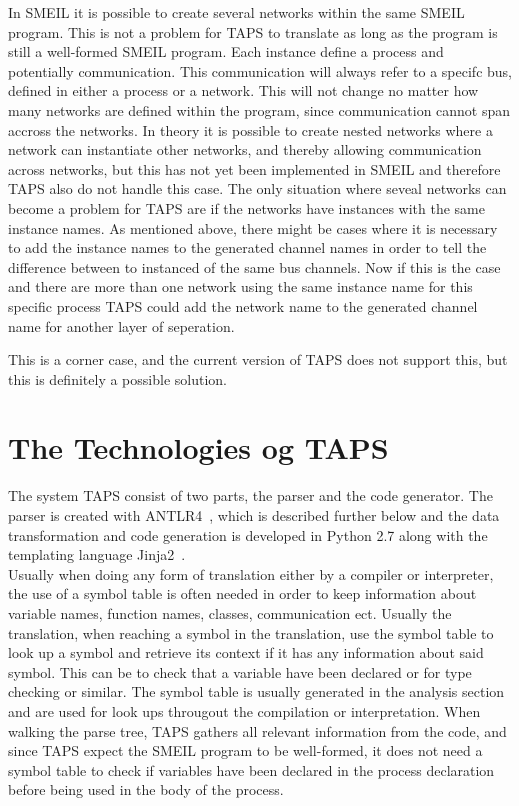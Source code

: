In SMEIL it is possible to create several networks within the same SMEIL program. This is not a problem for TAPS to translate as long as the program is still a well-formed SMEIL program. Each instance define a process and potentially communication. This communication will always refer to a specifc bus, defined in either a process or a network. This will not change no matter how many networks are defined within the program, since communication cannot span accross the networks.
In theory it is possible to create nested networks where a network can instantiate other networks, and thereby allowing communication across networks, but this has not yet been implemented in SMEIL and therefore TAPS also do not handle this case.
The only situation where seveal networks can become a problem for TAPS are if the networks have instances with the same instance names. As mentioned above, there might be cases where it is necessary to add the instance names to the generated \cspm{} channel names in order to tell the difference between to instanced of the same bus channels. Now if this is the case and there are more than one network using the same instance name for this specific process TAPS could add the network name to the generated \cspm{} channel name for another layer of seperation.

This is a corner case, and the current version of TAPS does not support this, but this is definitely a possible solution.


\section{The Technologies og TAPS}
The system TAPS consist of two parts, the parser and the code generator. The parser is created with ANTLR4~\cite{antlr}, which is described further below and the data transformation and code generation is developed in Python 2.7 along with the templating language Jinja2~\cite{jinja2}.\\

Usually when doing any form of translation either by a compiler or interpreter, the use of a symbol table is often needed in order to keep information about variable names, function names, classes, communication ect. Usually the translation, when reaching a symbol in the translation, use the symbol table to look up a symbol and retrieve its context if it has any information about said symbol. This can be to check that a variable have been declared or for type checking or similar. The symbol table is usually generated in the analysis section and are used for look ups througout the compilation or interpretation. When walking the parse tree, TAPS gathers all relevant information from the code, and since TAPS expect the SMEIL program to be well-formed, it does not need a symbol table to check if variables have been declared in the process declaration before being used in the body of the process.
